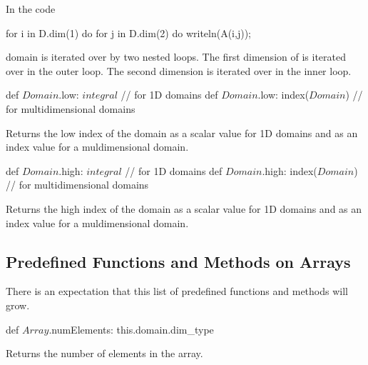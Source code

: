 \begin{example}
In the code
\begin{chapel}
for i in D.dim(1) do
  for j in D.dim(2) do
    writeln(A(i,j));
\end{chapel}
domain  is iterated over by two nested loops.  The first
dimension of  is iterated over in the outer loop.  The second
dimension is iterated over in the inner loop.
\end{example}


\begin{protohead}
def $Domain$.low: $integral$        // for 1D domains
def $Domain$.low: index($Domain$)   // for multidimensional domains
\end{protohead}
\begin{protobody}
Returns the low index of the domain as a scalar value for 1D domains
and as an index value for a muldimensional domain.
\end{protobody}

\begin{protohead}
def $Domain$.high: $integral$        // for 1D domains
def $Domain$.high: index($Domain$)   // for multidimensional domains
\end{protohead}
\begin{protobody}
Returns the high index of the domain as a scalar value for 1D domains
and as an index value for a muldimensional domain.
\end{protobody}

\subsection{Predefined Functions and Methods on Arrays}

There is an expectation that this list of predefined functions and
methods will grow.

\begin{protohead}
def $Array$.numElements: this.domain.dim_type
\end{protohead}
\begin{protobody}
Returns the number of elements in the array.
\end{protobody}
